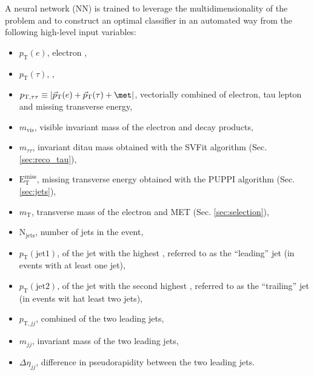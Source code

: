 A neural network (NN) is trained to leverage the multidimensionality of the problem and to construct an optimal classifier in an automated way from the following high-level input variables: 
\begin{itemize}
    \item $p_\text{T}(e)$, electron \pt,
    \item $p_\text{T}(\tau)$, \tauh \pt, 
    \item $p_{\text{T}, \tau\tau} \equiv |\vec{p}_{\text{T}}(e) + \vec{p}_{\text{T}}(\tau) + \met|$, vectorially combined \pt of electron, tau lepton and missing transverse energy, 
    \item $m_\text{vis}$, visible invariant mass of the electron and \tauh decay products, 
    \item $m_{\tau\tau}$, invariant ditau mass obtained with the SVFit algorithm (Sec. \ref{sec:reco_tau}),
    \item $\text{E}_\text{T}^\text{miss}$, missing transverse energy obtained with the PUPPI algorithm (Sec. \ref{sec:jets}),
    \item $m_\text{T}$, transverse mass of the electron and MET (Sec. \ref{sec:selection}),
    \item $\text{N}_\text{jets}$, number of jets in the event,
    \item $p_\text{T}(\text{jet1})$, \pt of the jet with the highest \pt, referred to as the \enquote{leading} jet (in events with at least one jet),
    \item $p_\text{T}(\text{jet2})$, \pt of the jet with the second highest \pt, referred to as the \enquote{trailing} jet (in events wit hat least two jets),
    \item $p_{\text{T}, jj}$, combined \pt of the two leading jets, 
    \item $m_{jj}$, invariant mass of the two leading jets, 
    \item $\Delta\eta_{jj}$, difference in pseudorapidity between the two leading jets.
\end{itemize}

